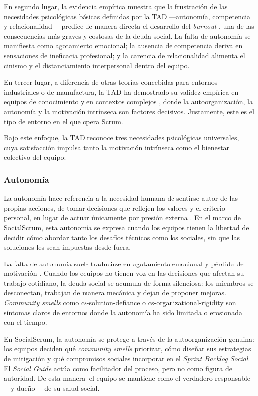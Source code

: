 En segundo lugar, la evidencia empírica muestra que la frustración de las necesidades psicológicas básicas definidas por la TAD —autonomía, competencia y relacionalidad— predice de manera directa el desarrollo del \textit{burnout} \cite{tulili2022burnout}, una de las consecuencias más graves y costosas de la deuda social.
La falta de autonomía se manifiesta como agotamiento emocional; la ausencia de competencia deriva en sensaciones de ineficacia profesional; y la carencia de relacionalidad alimenta el cinismo y el distanciamiento interpersonal dentro del equipo.

En tercer lugar, a diferencia de otras teorías concebidas para entornos industriales o de manufactura, la TAD ha demostrado su validez empírica en equipos de conocimiento y en contextos complejos \cite{ryan_self-determination_2000}, donde la autoorganización, la autonomía y la motivación intrínseca son factores decisivos. Justamente, este es el tipo de entorno en el que opera Scrum.

Bajo este enfoque, la TAD reconoce tres necesidades psicológicas universales, cuya satisfacción impulsa tanto la motivación intrínseca como el bienestar colectivo del equipo:

\subsubsection{Autonomía}

La autonomía hace referencia a la necesidad humana de sentirse autor de las propias acciones, de tomar decisiones que reflejen los valores y el criterio personal, en lugar de actuar únicamente por presión externa \cite{ryan_self-determination_2000}.
En el marco de SocialScrum, esta autonomía se expresa cuando los equipos tienen la libertad de decidir cómo abordar tanto los desafíos técnicos como los sociales, sin que las soluciones les sean impuestas desde fuera.

La falta de autonomía suele traducirse en agotamiento emocional y pérdida de motivación \cite{tulili2022burnout}.
Cuando los equipos no tienen voz en las decisiones que afectan su trabajo cotidiano, la deuda social se acumula de forma silenciosa: los miembros se desconectan, trabajan de manera mecánica y dejan de proponer mejoras.
\textit{Community smells} como \gls{cs-solution-defiance} o \gls{cs-organizational-rigidity} son síntomas claros de entornos donde la autonomía ha sido limitada o erosionada con el tiempo.

En SocialScrum, la autonomía se protege a través de la autoorganización genuina: los equipos deciden qué \textit{community smells} priorizar, cómo diseñar sus estrategias de mitigación y qué compromisos sociales incorporar en el \textit{Sprint Backlog Social}.
El \textit{Social Guide} actúa como facilitador del proceso, pero no como figura de autoridad. De esta manera, el equipo se mantiene como el verdadero responsable —y dueño— de su salud social.

